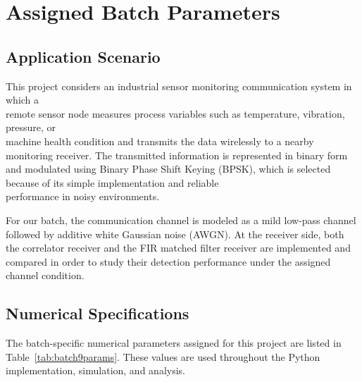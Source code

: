 \chapter{Assigned Batch Parameters}

\section{Application Scenario}
This project considers an industrial sensor monitoring communication system in which a \\remote sensor node measures process variables 
such as temperature, vibration, pressure, or \\machine health condition and transmits the data wirelessly to a nearby monitoring receiver. 
The transmitted information is represented in binary form and modulated using Binary Phase Shift Keying (BPSK), 
which is selected because of its simple implementation and reliable \\performance in noisy environments.

For our batch, the communication channel is modeled as a mild low-pass channel followed by additive white Gaussian noise (AWGN). 
At the receiver side, both the correlator receiver and the FIR matched filter receiver are implemented and compared in order 
to study their detection performance under the assigned channel condition.

\section{Numerical Specifications}
The batch-specific numerical parameters assigned for this project are listed in Table~\ref{tab:batch9params}. 
These values are used throughout the Python implementation, simulation, and analysis.

